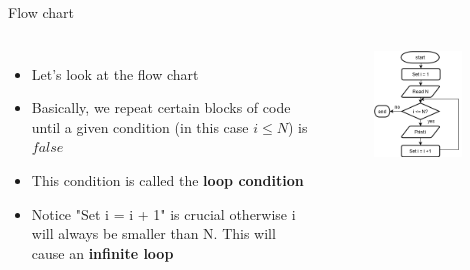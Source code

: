 \documentclass[10pt,xcolor={table,dvipsnames},t]{beamer}
\begin{document}
\begin{frame}{Flow chart}
  \begin{columns}
    \begin{itemize}
      \item Let's look at the flow chart
      \item Basically, we repeat certain blocks of code until a given condition (in this case $i\leq N$) is $false$
      \item This condition is called the \textbf{loop condition}
      \item Notice "Set i = i + 1" is crucial otherwise i will always be smaller than N. This will cause an \textbf{infinite loop}
    \end{itemize}
    \begin{figure}
      \includegraphics[width=0.9\textwidth]{img/print_first_n_flowchart.png}
    \end{figure}
  \end{columns}
\end{frame}
\end{document}
